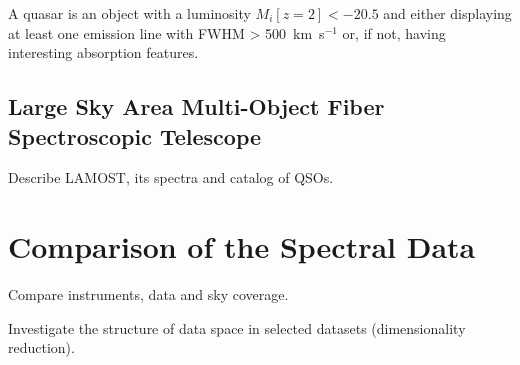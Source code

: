 \begin{definition}
	A quasar is an object with a luminosity \(M_i[z = 2] < -20.5\)
	and either displaying at least one emission line with FWHM > 500~km~s\(^{-1}\) or,
	if not, having interesting absorption features.
	\label{qso_definition}
\end{definition}

\subsection{Large Sky Area Multi-Object Fiber Spectroscopic Telescope}

Describe LAMOST, its spectra and catalog of QSOs.

\section{Comparison of the Spectral Data}

Compare instruments, data and sky coverage.

Investigate the structure of data space in selected datasets (dimensionality reduction).
